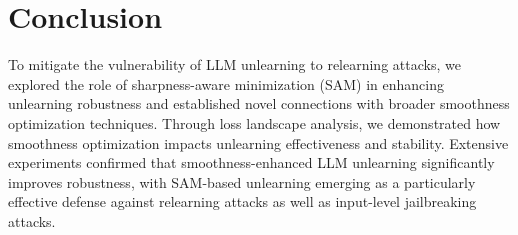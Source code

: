 \vspace*{-3mm}
\section{Conclusion}
\label{sec: conclusion}
\vspace*{-1mm}
To mitigate the vulnerability of LLM unlearning to relearning attacks, we explored the role of sharpness-aware minimization (SAM) in enhancing unlearning robustness and established novel connections with broader smoothness optimization techniques. Through loss landscape analysis, we demonstrated how smoothness optimization impacts unlearning effectiveness and stability. Extensive experiments confirmed that smoothness-enhanced LLM unlearning significantly improves robustness, with SAM-based unlearning emerging as a particularly effective defense against relearning attacks as well as input-level jailbreaking attacks.